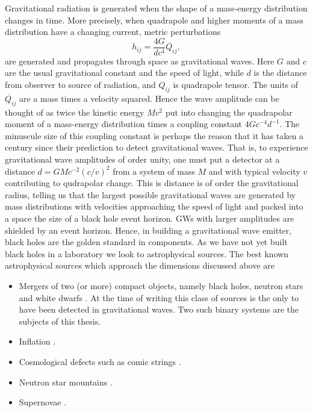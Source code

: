 Gravitational radiation is generated when the shape of a mass-energy distribution changes in time. More precisely, when quadrapole and higher moments of a mass distribution have a changing current, metric perturbations
\begin{equation}
h_{i j} = \frac{4G}{d c^4} \ddot{Q_{ij}},
\end{equation}
are generated and propagates through space as gravitational waves. Here $G$ and $c$ are the usual gravitational constant and the speed of light, while $d$ is the distance from observer to source of radiation, and $Q_{ij}$ is quadrapole tensor. The units of $\ddot{Q_{ij}}$ are a mass times a velocity squared. Hence the wave amplitude can be thought of as twice the kinetic energy $M v^2$ put into changing the quadrapolar moment of a mass-energy distribution times a coupling constant $4 Gc^{-4}d^{-1}$. The minuscule size of this coupling constant is perhaps the reason that it has taken a century since their prediction to detect gravitational waves. That is, to experience gravitational wave amplitudes of order unity, one must put a detector at a distance $d=GMc^{-2} (c/v)^2$ from a system of mass $M$ and with typical velocity $v$ contributing to qudrapolar change. This is distance is of order the gravitational radius, telling us that the largest possible gravitational waves are generated by mass distributions with velocities approaching the speed of light and packed into a space the size of a black hole event horizon. GWs with larger amplitudes are shielded by an event horizon. Hence, in building a gravitational wave emitter, black holes are the golden standard in components. As we have not yet built black holes in a laboratory we look to astrophysical sources. The best known astrophysical sources which approach the dimensions discussed above are
\begin{itemize}
\item Mergers of two (or more) compact objects, namely black holes, neutron stars and white dwarfs \citep{}. At the time of writing this class of sources is the only to have been detected in gravitational waves\citep{GW091415}. Two such binary systems are the subjects of this thesis.
\item Inflation \citep[\textit{e.g.}][]{Guzzatti:2016}.
\item Cosmological defects such as comic strings  \citep[\textit{e.g.}][]{}.
\item Neutron star mountains  \citep[\textit{e.g.}][]{}.
\item Supernovae  \citep[\textit{e.g.}][]{}.
\end{itemize}


